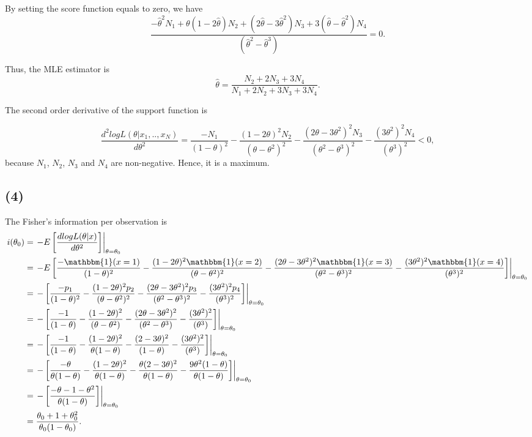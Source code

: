 \documentclass[
]{article}
\begin{document}
By setting the score function equals to zero, we have
\[\frac{-\hat{\theta}^2N_1+\theta(1-2\hat{\theta})N_2+(2\hat{\theta}-3\hat{\theta}^2)N_3+3(\hat{\theta}-\hat{\theta}^2)N_4}{(\hat{\theta}^2-\hat{\theta}^3)}=0.\]

Thus, the MLE estimator is
\[\hat{\theta} = \frac{N_2+2N_3+3N_4}{N_1+2N_2+3N_3+3N_4}.\]

The second order derivative of the support function is

\[\frac{d^2logL(\theta|x_1,..,x_N)}{d\theta^2} = \frac{-N_1}{(1-\theta)^2}-\frac{(1-2\theta)^2N_2}{(\theta-\theta^2)^2}-\frac{(2\theta-3\theta^2)^2N_3}{(\theta^2-\theta^3)^2}-\frac{(3\theta^2)^2N_4}{(\theta^3)^2}<0,\]
because \(N_1\), \(N_2\), \(N_3\) and \(N_4\) are non-negative. Hence,
it is a maximum.

\hypertarget{section-3}{%
\subsection{(4)}\label{section-3}}

The Fisher's information per observation is \begin{align*}
i(\theta_0) &= \left.-E\left[\frac{dlogL(\theta|x)}{d\theta^2}\right]\right|_{\theta = \theta_0} \\
&= \left.-E\left[\frac{-\mathbbm{1}(x = 1)}{(1-\theta)^2}-\frac{(1-2\theta)^2\mathbbm{1}(x = 2)}{(\theta-\theta^2)^2}-\frac{(2\theta-3\theta^2)^2\mathbbm{1}(x = 3)}{(\theta^2-\theta^3)^2}-\frac{(3\theta^2)^2\mathbbm{1}(x = 4)}{(\theta^3)^2}\right]\right|_{\theta = \theta_0} \\
&= \left.-\left[\frac{-p_1}{(1-\theta)^2}-\frac{(1-2\theta)^2p_2}{(\theta-\theta^2)^2}-\frac{(2\theta-3\theta^2)^2p_3}{(\theta^2-\theta^3)^2}-\frac{(3\theta^2)^2p_4}{(\theta^3)^2}\right]\right|_{\theta = \theta_0} \\
&= \left.-\left[\frac{-1}{(1-\theta)}-\frac{(1-2\theta)^2}{(\theta-\theta^2)}-\frac{(2\theta-3\theta^2)^2}{(\theta^2-\theta^3)}-\frac{(3\theta^2)^2}{(\theta^3)}\right]\right|_{\theta = \theta_0} \\
&= \left.-\left[\frac{-1}{(1-\theta)}-\frac{(1-2\theta)^2}{\theta(1-\theta)}-\frac{(2-3\theta)^2}{(1-\theta)}-\frac{(3\theta^2)^2}{(\theta^3)}\right]\right|_{\theta = \theta_0} \\
&= \left.-\left[\frac{-\theta}{\theta(1-\theta)}-\frac{(1-2\theta)^2}{\theta(1-\theta)}-\frac{\theta(2-3\theta)^2}{\theta(1-\theta)}-\frac{9\theta^2(1-\theta)}{\theta(1-\theta)}\right]\right|_{\theta = \theta_0} \\
&= \left.-\left[\frac{-\theta-1-\theta^2}{\theta(1-\theta)}\right]\right|_{\theta = \theta_0} \\
&= \frac{\theta_0+1+\theta_0^2}{\theta_0(1-\theta_0)}. \\
\end{align*}
\end{document}
